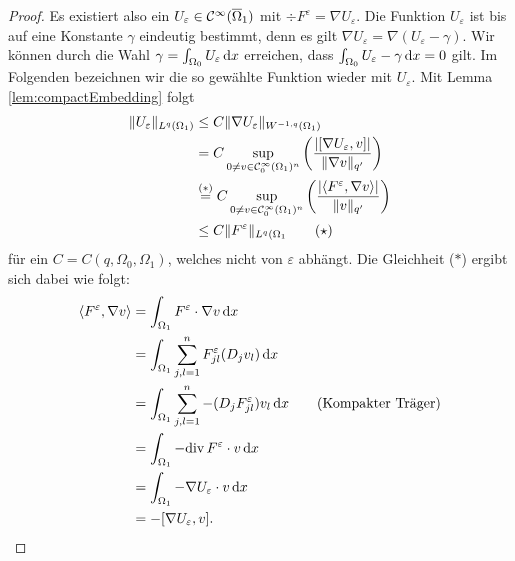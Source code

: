 \begin{proof}
  Es existiert also ein $U_\varepsilon \in \mathcal{C}^\infty(\overline\Omega_1)$ mit $\div F^\varepsilon = \nabla U_\varepsilon$.
  Die Funktion $U_\varepsilon$ ist bis auf eine Konstante $\gamma$ eindeutig bestimmt, denn es gilt $\nabla U_\varepsilon = \nabla( U_\varepsilon - \gamma)$.
  Wir können durch die Wahl $\gamma = \int_{\Omega_0} U_\varepsilon \, {\operatorname{d}\!{x}}$ erreichen, dass $\int_{\Omega_0} U_\varepsilon - \gamma \, {\operatorname{d}\!{x}} = 0$  gilt.
  Im Folgenden bezeichnen wir die so gewählte Funktion wieder mit $U_\varepsilon$.
  Mit Lemma \ref{lem:compactEmbedding} folgt
  \begingroup
  \addtolength{\jot}{1em}
  \begin{align*}
    \lVert U_\varepsilon \rVert_{L^q(\Omega_1)}
    &\leq C \lVert  \nabla U_\varepsilon  \rVert_{W^{-1,q}(\Omega_1)} \\
    &= C \sup_{0 \neq v \in \mathcal{C}_0^\infty(\Omega_1)^n} \left(\frac{|[\nabla U_\varepsilon, v]|}{\lVert \nabla v \rVert_{q'}} \right) \\
    &\overset{(\ast)}{=} C \sup_{0 \neq v \in \mathcal{C}_0^\infty(\Omega_1)^n} \left( \frac{|\langle F^\varepsilon, \nabla v \rangle|}{\lVert v \rVert_{q'}}\right) \\
    &\leq C \lVert F^\varepsilon \rVert_{L^q(\Omega_1} \tag{$\star$}
  \end{align*}
  \endgroup
  für ein $C = C(q,\Omega_0,\Omega_1)$, welches nicht von $\varepsilon$ abhängt. 
  Die Gleichheit ($\ast$) ergibt sich dabei wie folgt:
  \begin{align*}
    \langle F^\varepsilon, \nabla v \rangle
    &= \int_{\Omega_1} F^\varepsilon \cdot \nabla v \, {\operatorname{d}\!{x}} \\
    &= \int_{\Omega_1} \sum_{j,l=1}^n F_{jl}^\varepsilon (D_j v_l) \, {\operatorname{d}\!{x}} \\
    &= \int_{\Omega_1} \sum_{j,l=1}^n -(D_jF_{jl}^\varepsilon) v_l \, {\operatorname{d}\!{x}} \tag{Kompakter Träger}\\
    &= \int_{\Omega_1} -\mathrm{div\,} F^\varepsilon \cdot v \, {\operatorname{d}\!{x}} \\
    &= \int_{\Omega_1} -\nabla U_\varepsilon \cdot v \, {\operatorname{d}\!{x}} \\
    &= -[\nabla U_\varepsilon, v].
  \end{align*}


\end{proof}
